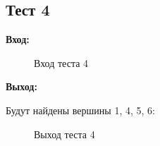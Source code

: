 \documentclass[a4paper]{article}
\begin{document}
\subsection{Тест 4}

\textbf{Вход:}
\newpage
  \begin{figure}[!h]
    \caption{Вход теста 4}
  \end{figure}
\par
\textbf{Выход:} \par
  Будут найдены вершины 1, 4, 5, 6:
  \begin{figure}[!h]
    \caption{Выход теста 4}
  \end{figure}
\newpage
\end{document}
